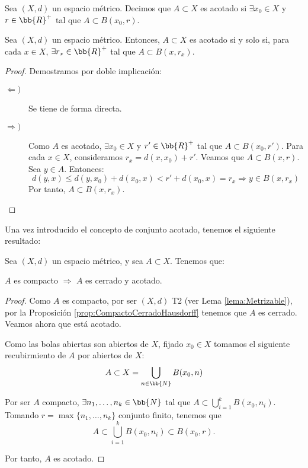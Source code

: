 \begin{definicion}
    Sea $(X,d)$ un espacio métrico. Decimos que $A\subset X$ es acotado si $\exists x_0\in X$ y $r\in \bb{R}^+$ tal que $A\subset B(x_0,r)$.
\end{definicion}
\begin{lema}
    Sea $(X,d)$ un espacio métrico. Entonces, $A\subset X$ es acotado si y solo si, para cada $x\in X$, $\exists r_x\in \bb{R}^+$ tal que $A\subset B(x,r_x)$.
\end{lema}
\begin{proof}
    Demostramos por doble implicación:
    \begin{description}
        \item[$\Longleftarrow)$] Se tiene de forma directa.
        \item[$\Longrightarrow)$] Como $A$ es acotado, $\exists x_0\in X$ y $r'\in \bb{R}^+$ tal que $A\subset B(x_0,r')$. Para cada $x\in X$, consideramos $r_x=d(x,x_0)+r'$.
        Veamos que $A\subset B(x,r)$. Sea $y\in A$. Entonces:
        \begin{equation*}
            d(y,x) \leq d(y,x_0) + d(x_0,x) < r' + d(x_0,x) = r_x \Longrightarrow y\in B(x,r_x)  
        \end{equation*}
        Por tanto, $A\subset B(x,r_x)$.  \qedhere
    \end{description}
\end{proof}


Una vez introducido el concepto de conjunto acotado, tenemos el siguiente resultado:
\begin{prop}\label{prop:CompactoCerradoAcotado}
    Sea $(X,d)$ un espacio métrico, y sea $A\subset X$. Tenemos que:
    \begin{center}
        $A$ es compacto $\Longrightarrow$ $A$ es cerrado y acotado.
    \end{center}
\end{prop}
\begin{proof}
    Como $A$ es compacto, por ser $(X,d)$ T2 (ver Lema \ref{lema:Metrizable}), por la Proposición \ref{prop:CompactoCerradoHausdorff} tenemos que $A$ es cerrado. Veamos ahora que está acotado.
        
    Como las bolas abiertas son abiertos de $X$, fijado $x_0\in X$ tomamos el siguiente recubirmiento de $A$ por abiertos de $X$:
    \begin{equation*}
        A\subset X = \bigcup_{n \in \bb{N}}B(x_0,n)
    \end{equation*}

    Por ser $A$ compacto, $\exists n_1,\dots,n_k\in \bb{N}$ tal que $A\subset \bigcup\limits_{i=1}^k B(x_0,n_i)$.
    Tomando $r=\max\{n_1,\dots,n_k\}$ conjunto finito, tenemos que $$A\subset \bigcup\limits_{i=1}^k B(x_0,n_i) \subset B(x_0,r).$$
    
    Por tanto, $A$ es acotado.
\end{proof}

